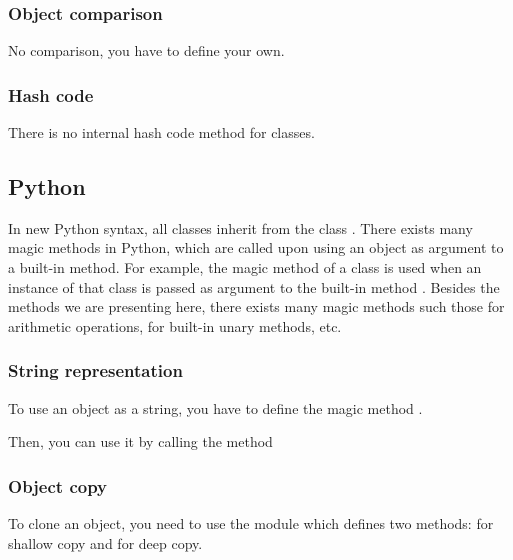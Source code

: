 \documentclass{KodeBook}
\begin{document}


\subsubsection{Object comparison}

No comparison, you have to define your own. 

\subsubsection{Hash code}

There is no internal hash code method for classes.

\subsection{Python}

In new Python syntax, all classes inherit from the class . 
There exists many magic methods in Python, which are called upon using an object as argument to a built-in method. 
For example, the magic method  of a class is used when an instance of that class is passed as argument to the built-in method .
Besides the methods we are presenting here, there exists many magic methods such those for arithmetic operations, for built-in unary methods, etc.

\subsubsection{String representation}

To use an object as a string, you have to define the magic method .



Then, you can use it by calling the method 



\subsubsection{Object copy}

To clone an object, you need to use the module  which defines two methods:  for shallow copy and  for deep copy.
\end{document}
